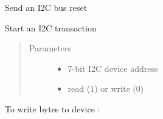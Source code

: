 \begin{fulllineitems}
\begin{fulllineitems}
\end{fulllineitems}


\begin{fulllineitems}
\label{\detokenize{index:i2cdriver.I2CDriver.reset}}
Send an I2C bus reset

\end{fulllineitems}


\begin{fulllineitems}
\label{\detokenize{index:i2cdriver.I2CDriver.start}}
Start an I2C transaction
\begin{quote}\begin{description}
\item[{Parameters}] \leavevmode\begin{itemize}
\item {} 
 \textendash{} 7-bit I2C device address

\item {} 
 \textendash{} read (1) or write (0)

\end{itemize}

\end{description}\end{quote}

To write bytes \sphinxcode{\sphinxupquote{{[}0x12,0x34{]}}} to device :

\begin{sphinxVerbatim}[commandchars=\\\{\}]
 
\PYG{p}{[}\PYG{p}{]}
\end{sphinxVerbatim}

\end{fulllineitems}


\end{fulllineitems}

